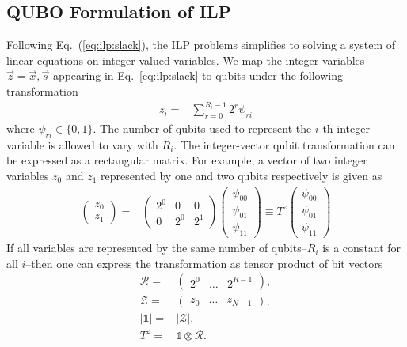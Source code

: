 \documentclass[10pt]{iopart}
\begin{document}
\subsection{QUBO Formulation of ILP}
\label{sec:results:qa1}
Following Eq.~(\ref{eq:ilp:slack}), the ILP problems simplifies to solving a system of linear equations on integer valued variables. We map the integer variables $\vec z = \vec x, \vec s$ appearing in Eq.~\eqref{eq:ilp:slack} to qubits under the following transformation~\cite{Chang:2018uoc}
\begin{align}
 z_i = & \sum_{r=0}^{R_i-1} 2^r \psi_{ri}
 \label{eq:int_to_bin}
\end{align}
where $\psi_{ri} \in \{0, 1\}$. The number of qubits used to represent the $i$-th integer variable is allowed to vary with $R_i$.
The integer-vector qubit transformation can be expressed as a rectangular matrix.
For example, a vector of two integer variables $z_0$ and $z_1$ represented by one and two qubits respectively is given as
\begin{align}
 \begin{pmatrix}
  z_0 \\
  z_1
 \end{pmatrix}
 = &
 \begin{pmatrix}
  2^0 & 0   & 0   \\
  0   & 2^0 & 2^1
 \end{pmatrix}
 \begin{pmatrix}
  \psi_{00} \\
  \psi_{01} \\
  \psi_{11}
 \end{pmatrix}
 \equiv T^z \begin{pmatrix}
  \psi_{00} \\
  \psi_{01} \\
  \psi_{11}
 \end{pmatrix}
\end{align}
If all variables are represented by the same number of qubits--$R_i$ is a constant for all $i$--then one can express the transformation as tensor product of bit vectors
\begin{align}
 \mathcal{R} =  & \begin{pmatrix} 2^0 & \dots & 2^{R-1}\end{pmatrix},    \\
 \mathcal{Z} =  & \begin{pmatrix} z_0 & \dots & z_{N-1}\end{pmatrix},    \\
 |\mathds{1}| = & |\mathcal{Z}|,                 \\
 T^z =          & \mathds{1}\otimes \mathcal{R}.
\end{align}
\end{document}
